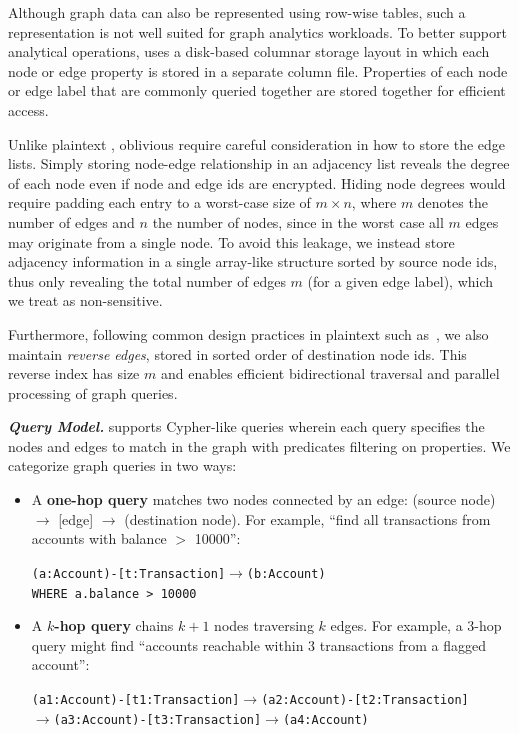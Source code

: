 Although graph data can also be represented using row-wise tables, such a representation is not 
well suited for graph analytics workloads. To better support analytical operations, 
\system uses a disk-based columnar storage layout in which each node or edge property is 
stored in a separate column file. Properties of each node or edge label that are commonly 
queried together are stored together for efficient access.

Unlike plaintext \gdbs, oblivious \gdbs require careful consideration in how to store the
edge lists. Simply storing node-edge relationship in an adjacency list reveals the degree of 
each node even if node and edge ids are encrypted. Hiding node degrees would require padding 
each entry to a worst-case size of $m \times n$, where $m$ denotes the number of edges and $n$ 
the number of nodes, since in the worst case all $m$ edges may originate from a single node.
To avoid this leakage, we instead store adjacency information in a single array-like structure 
sorted by source node ids, thus only revealing the total number of edges $m$ (for a given edge 
label), which we treat as non-sensitive.

Furthermore, following common design practices in plaintext \gdbs such 
as~\cite{janusgraph,feng2023kuzu,deutsch2019tigergraph,sun2015sqlgraph}, we also maintain 
\textit{reverse edges}, stored in sorted order of destination node ids. This reverse index has 
size $m$ and enables efficient bidirectional traversal and parallel processing of graph 
queries. 


\noindent\textbf{\textit{Query Model.}} \system supports Cypher-like queries \cite{francis2018cypher, opencypher} wherein each query specifies the nodes and edges to match 
in the graph with predicates filtering on properties. We categorize graph queries in
two ways:

\begin{itemize}[leftmargin=*]
    \item A \textbf{one-hop query} matches two nodes connected by an edge: (source node) $\rightarrow$ [edge] $\rightarrow$ (destination node). For example, ``find all transactions from accounts with balance $>$ 10000'':
    \begin{center}
    \texttt{(a:Account)-[t:Transaction]$\rightarrow$(b:Account)}\\
    \texttt{WHERE a.balance > 10000}
    \end{center}

    \item A \textbf{$k$-hop query} chains $k+1$ nodes traversing $k$ edges. For example, a 3-hop query might find ``accounts reachable within 3 transactions from a flagged account'':
    \begin{center}
    \small\texttt{(a1:Account)-[t1:Transaction]$\rightarrow$(a2:Account)-[t2:Transaction]\\
    $\rightarrow$}\small\texttt{(a3:Account)-[t3:Transaction]$\rightarrow$(a4:Account)}
    \end{center}
\end{itemize}


